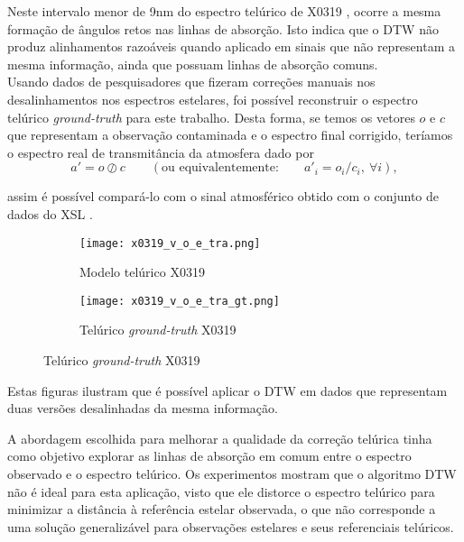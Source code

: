 \documentclass[a1]{sciposter}
\begin{document}
\begin{multicols}{2}
Neste intervalo menor de 9nm do espectro telúrico de X0319 \cite{Chen2014TheXS}, ocorre a mesma formação de ângulos retos nas linhas de absorção. Isto indica que o DTW não produz alinhamentos razoáveis quando aplicado em sinais que não representam a mesma informação, ainda que possuam linhas de absorção comuns.\\

Usando dados de pesquisadores \cite{unpublished-xshooter-data-release} que fizeram correções manuais nos desalinhamentos nos espectros estelares, foi possível reconstruir o espectro telúrico \textit{ground-truth} para este trabalho. Desta forma, se temos os vetores $o$ e $c$ que representam a observação contaminada e o espectro final corrigido, teríamos o espectro real de transmitância da atmosfera dado por
\begin{equation*}
    a' = o \oslash c \qquad \left(\mbox{ou equivalentemente:} \qquad a'_{i} = o_i / c_i,\ \forall i\right),
\end{equation*}

assim é possível compará-lo com o sinal atmosférico obtido com o conjunto de dados do XSL \cite{Chen2014TheXS}.

\begin{figure}
 \centering
 \begin{subfigure}{0.4\textwidth}
  \centering
  \texttt{[image: x0319\_v\_o\_e\_tra.png]}
  \caption{Modelo telúrico X0319}
 \end{subfigure}\hfil
 \begin{subfigure}{0.4\textwidth}
  \centering
  \texttt{[image: x0319\_v\_o\_e\_tra\_gt.png]}
  \caption{Telúrico \textit{ground-truth} X0319}
 \end{subfigure}\hfil
\end{figure}

Estas figuras ilustram que é possível aplicar o DTW em dados que representam duas versões desalinhadas da mesma informação.


A abordagem escolhida para melhorar a qualidade da correção telúrica tinha como objetivo explorar as linhas de absorção em comum entre o espectro observado e o espectro telúrico. Os experimentos mostram que o algoritmo DTW não é ideal para esta aplicação, visto que ele distorce o espectro telúrico para minimizar a distância à referência estelar observada, o que não corresponde a uma solução generalizável para observações estelares e seus referenciais telúricos. 

% 





\end{multicols}
\end{document}
